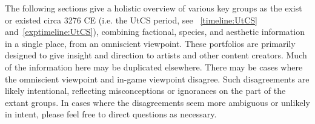 \label{chapt:portfolios}
The following sections give a holistic overview of various key groups
as the exist or existed circa 3276 CE (i.e. the UtCS period, see
~\ref{timeline:UtCS} and~\ref{exptimeline:UtCS}), combining factional, species, and aesthetic
information in a single place, from an omniscient viewpoint. These
portfolios are primarily designed to give insight and direction to
artists and other content creators. Much of the information here may
be duplicated elsewhere. There may be cases where the omniscient
viewpoint and in-game viewpoint disagree. Such disagreements are
likely intentional, reflecting misconceptions or ignorances on the
part of the extant groups. In cases where the disagreements seem more
ambiguous or unlikely in intent, please feel free to direct questions
as necessary.



%
